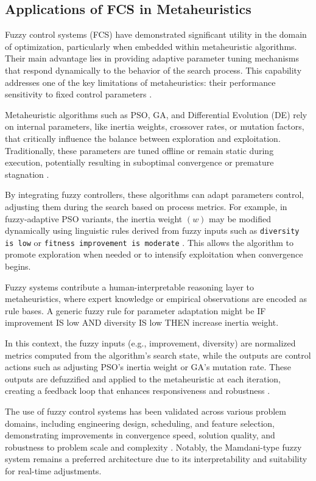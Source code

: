 \subsection{Applications of FCS in Metaheuristics}
Fuzzy control systems (FCS) have demonstrated significant utility in the domain of optimization, particularly when embedded within metaheuristic algorithms. Their main advantage lies in providing adaptive parameter tuning mechanisms that respond dynamically to the behavior of the search process. This capability addresses one of the key limitations of metaheuristics: their performance sensitivity to fixed control parameters \parencite{valdez2014survey, diaz2017new}.

Metaheuristic algorithms such as PSO, GA, and Differential Evolution (DE) rely on internal parameters, like inertia weights, crossover rates, or mutation factors, that critically influence the balance between exploration and exploitation. Traditionally, these parameters are tuned offline or remain static during execution, potentially resulting in suboptimal convergence or premature stagnation \parencite{sadollah2018introductory, valdez2010fuzzy}.

By integrating fuzzy controllers, these algorithms can adapt parameters control, adjusting them during the search based on process metrics. For example, in fuzzy-adaptive PSO variants, the inertia weight $(w)$ may be modified dynamically using linguistic rules derived from fuzzy inputs such as \texttt{diversity is low} or \texttt{fitness improvement is moderate} \parencite{valdez2014survey}. This allows the algorithm to promote exploration when needed or to intensify exploitation when convergence begins.

Fuzzy systems contribute a human-interpretable reasoning layer to metaheuristics, where expert knowledge or empirical observations are encoded as rule bases. A generic fuzzy rule for parameter adaptation might be IF improvement IS low AND diversity IS low THEN increase inertia weight.

In this context, the fuzzy inputs (e.g., improvement, diversity) are normalized metrics computed from the algorithm’s search state, while the outputs are control actions such as adjusting PSO’s inertia weight or GA’s mutation rate. These outputs are defuzzified and applied to the metaheuristic at each iteration, creating a feedback loop that enhances responsiveness and robustness \parencite{diaz2017new, valdez2010fuzzy}.

The use of fuzzy control systems has been validated across various problem domains, including engineering design, scheduling, and feature selection, demonstrating improvements in convergence speed, solution quality, and robustness to problem scale and complexity \parencite{valdez2014survey,sadollah2018introductory}. Notably, the Mamdani-type fuzzy system remains a preferred architecture due to its interpretability and suitability for real-time adjustments.



